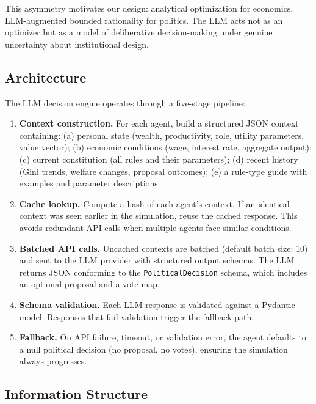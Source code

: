 \documentclass[12pt]{article}
\begin{document}
This asymmetry motivates our design: analytical optimization for economics, LLM-augmented bounded rationality for politics. The LLM acts not as an optimizer but as a model of deliberative decision-making under genuine uncertainty about institutional design.


\subsection{Architecture}\label{sec:llm_arch}

The LLM decision engine operates through a five-stage pipeline:

\begin{enumerate}
  \item \textbf{Context construction.} For each agent, build a structured JSON context containing: (a) personal state (wealth, productivity, role, utility parameters, value vector); (b) economic conditions (wage, interest rate, aggregate output); (c) current constitution (all rules and their parameters); (d) recent history (Gini trends, welfare changes, proposal outcomes); (e) a rule-type guide with examples and parameter descriptions.

  \item \textbf{Cache lookup.} Compute a hash of each agent's context. If an identical context was seen earlier in the simulation, reuse the cached response. This avoids redundant API calls when multiple agents face similar conditions.

  \item \textbf{Batched API calls.} Uncached contexts are batched (default batch size: 10) and sent to the LLM provider with structured output schemas. The LLM returns JSON conforming to the \texttt{PoliticalDecision} schema, which includes an optional proposal and a vote map.

  \item \textbf{Schema validation.} Each LLM response is validated against a Pydantic model. Responses that fail validation trigger the fallback path.

  \item \textbf{Fallback.} On API failure, timeout, or validation error, the agent defaults to a null political decision (no proposal, no votes), ensuring the simulation always progresses.
\end{enumerate}


\subsection{Information Structure}\label{sec:llm_info}
\end{document}

